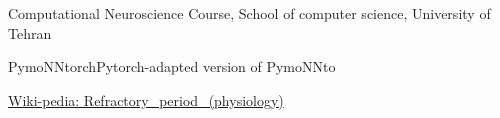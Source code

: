 \documentclass{article}
\begin{document}
\newpage
\begin{thebibliography}{1}
        \begin{latin}
            Computational Neuroscience Course, School of computer science, University of Tehran
        \end{latin}
        \begin{latin}
            PymoNNtorchPytorch-adapted version of PymoNNto
        \end{latin}
        \begin{latin}
            \href{https://en.wikipedia.org/wiki/Refractory_period_(physiology)}{Wiki-pedia: Refractory\_period\_(physiology)}
        \end{latin}
    \end{thebibliography}
\end{document}
